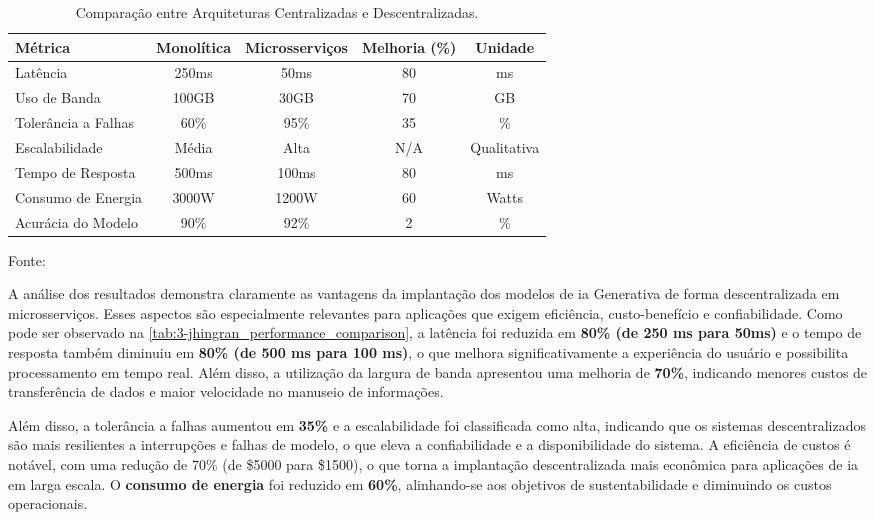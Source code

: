 \begin{table}[H]
\centering
\caption{Comparação entre Arquiteturas Centralizadas e Descentralizadas.}
\label{tab:3-jhingran_performance_comparison}
\begin{tabularx}{\textwidth}{| X | c | c | c | c |}
\hline
\textbf{Métrica} & \textbf{Monolítica} & \textbf{Microsserviços} & \textbf{Melhoria (\%)} & \textbf{Unidade} \\
\hline
Latência                  & 250ms   & 50ms    & 80 & ms \\
\hline
Uso de Banda              & 100GB   & 30GB    & 70 & GB \\
\hline
Tolerância a Falhas       & 60\%    & 95\%    & 35 & \% \\
\hline
Escalabilidade            & Média   & Alta    & N/A & Qualitativa \\
\hline
Tempo de Resposta         & 500ms   & 100ms   & 80 & ms \\
\hline
Consumo de Energia          & 3000W   & 1200W   & 60 & Watts \\
\hline
Acurácia do Modelo        & 90\%    & 92\%    & 2  & \% \\
\hline
\end{tabularx}
{\par \raggedright \footnotesize Fonte: \textcite{jhingran_decentralized_2024}\par}
\end{table}


A análise dos resultados demonstra claramente as vantagens da implantação dos modelos de \gls{ia} Generativa de forma descentralizada em microsserviços. Esses aspectos são especialmente relevantes para aplicações que exigem eficiência, custo-benefício e confiabilidade. Como pode ser observado na \autoref{tab:3-jhingran_performance_comparison}, a latência foi reduzida em\textbf{ 80\% (de 250 ms para 50ms)} e o tempo de resposta também diminuiu em \textbf{80\% (de 500 ms para 100 ms)}, o que melhora significativamente a experiência do usuário e possibilita processamento em tempo real. Além disso, a utilização da largura de banda apresentou uma melhoria de \textbf{70\%}, indicando menores custos de transferência de dados e maior velocidade no manuseio de informações.

Além disso, a tolerância a falhas aumentou em \textbf{35\%} e a escalabilidade foi classificada como alta, indicando que os sistemas descentralizados são mais resilientes a interrupções e falhas de modelo, o que eleva a confiabilidade e a disponibilidade do sistema. A eficiência de custos é notável, com uma redução de 70\% (de \$5000 para \$1500), o que torna a implantação descentralizada mais econômica para aplicações de \gls{ia} em larga escala. O \textbf{consumo de energia} foi reduzido em\textbf{ 60\%}, alinhando-se aos objetivos de sustentabilidade e diminuindo os custos operacionais. 

